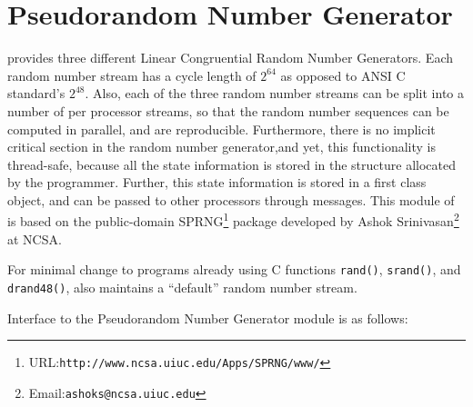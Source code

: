 \chapter{\converse{} Pseudorandom Number Generator}

\converse{} provides three different Linear Congruential Random Number Generators.
Each random number stream has a cycle length of $2^{64}$ as opposed to
ANSI C standard's $2^{48}$.
Also, each of the three random number streams can be split into a number of
per processor streams, so that the random number sequences can be computed 
in parallel, and are reproducible. Furthermore, there is no implicit critical
section in the random number generator,and yet, this functionality is
thread-safe, because all the state information is stored in the structure
allocated by the programmer. Further, this state information is stored in a
first class object, and can be passed to other processors through messages.
This module of \converse{} is based on the public-domain 
SPRNG\footnote{URL:{\tt http://www.ncsa.uiuc.edu/Apps/SPRNG/www/}} 
package developed
by Ashok Srinivasan\footnote{Email:{\tt ashoks@ncsa.uiuc.edu}} at NCSA.

For minimal change to programs already using C functions {\tt rand()},
{\tt srand()}, and {\tt drand48()}, \converse{} also maintains a ``default''
random number stream.

Interface to the \converse{} Pseudorandom Number Generator module is as follows:





\desc{}

